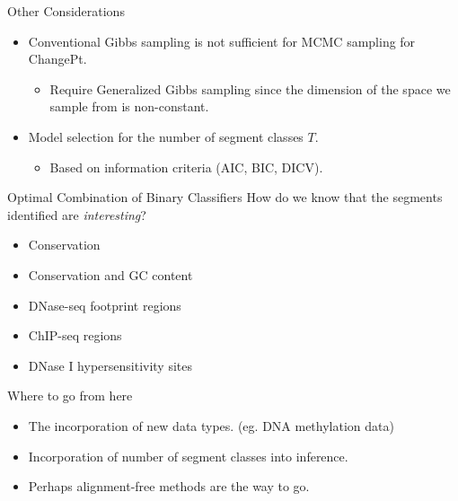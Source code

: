 \documentclass{beamer}
\begin{document}
    \begin{frame}{Other Considerations}
        \begin{itemize}
            \item Conventional Gibbs sampling is not sufficient for MCMC sampling for ChangePt.
                \pause
                \begin{itemize}
                    \item Require Generalized Gibbs sampling since the dimension of the space we sample from is non-constant.
                \end{itemize}
                \pause
            \item Model selection for the number of segment classes $T$.
                \pause
                \begin{itemize}
                    \item Based on information criteria (AIC, BIC, DICV).
                \end{itemize}
        \end{itemize}
        
    
        
    \end{frame}
    
    \begin{frame}{Optimal Combination of Binary Classifiers}
        How do we know that the segments identified are \emph{interesting}? 
        
        \begin{itemize}
            \item Conservation
            \item Conservation and GC content
            \item DNase-seq footprint regions
            \item ChIP-seq regions
            \item DNase I hypersensitivity sites
        \end{itemize}
    \end{frame}
    
    \begin{frame}{Where to go from here}
        \begin{itemize}
            \item The incorporation of new data types. (eg. DNA methylation data)
            \item Incorporation of number of segment classes into inference.
            \item Perhaps alignment-free methods are the way to go.
        \end{itemize}
    \end{frame}
    
\end{document}
